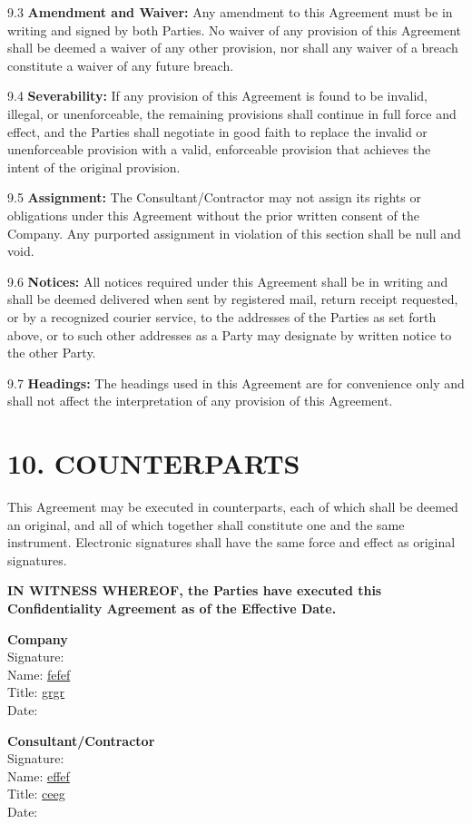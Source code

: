 \documentclass[12pt]{article}
\begin{document}
9.3 \textbf{Amendment and Waiver:} Any amendment to this Agreement must be in writing and signed by both Parties. No waiver of any provision of this Agreement shall be deemed a waiver of any other provision, nor shall any waiver of a breach constitute a waiver of any future breach.

9.4 \textbf{Severability:} If any provision of this Agreement is found to be invalid, illegal, or unenforceable, the remaining provisions shall continue in full force and effect, and the Parties shall negotiate in good faith to replace the invalid or unenforceable provision with a valid, enforceable provision that achieves the intent of the original provision.

9.5 \textbf{Assignment:} The Consultant/Contractor may not assign its rights or obligations under this Agreement without the prior written consent of the Company. Any purported assignment in violation of this section shall be null and void.

9.6 \textbf{Notices:} All notices required under this Agreement shall be in writing and shall be deemed delivered when sent by registered mail, return receipt requested, or by a recognized courier service, to the addresses of the Parties as set forth above, or to such other addresses as a Party may designate by written notice to the other Party.

9.7 \textbf{Headings:} The headings used in this Agreement are for convenience only and shall not affect the interpretation of any provision of this Agreement.

\section*{10. COUNTERPARTS}

This Agreement may be executed in counterparts, each of which shall be deemed an original, and all of which together shall constitute one and the same instrument. Electronic signatures shall have the same force and effect as original signatures.

\vspace{1cm}

\textbf{IN WITNESS WHEREOF, the Parties have executed this Confidentiality Agreement as of the Effective Date.}

\vspace{1cm}

\textbf{Company} \\
Signature: \underline{\hspace{6cm}} \\
Name: \underline{fefef} \\
Title: \underline{grgr} \\
Date: \underline{\hspace{5cm}}

\vspace{1cm}

\textbf{Consultant/Contractor} \\
Signature: \underline{\hspace{6cm}} \\
Name: \underline{effef} \\
Title: \underline{ceeg} \\
Date: \underline{\hspace{5cm}}
\end{document}
